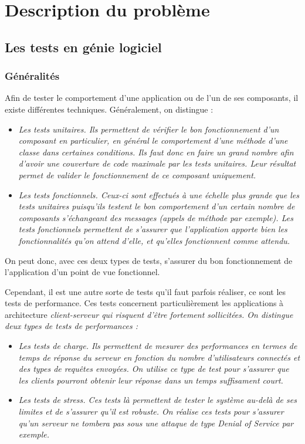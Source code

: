 \chapter{Description du problème}

\section{Les tests en génie logiciel}
\subsection{Généralités}
Afin de tester le comportement d'une application ou de l'un de ses composants, il existe différentes techniques. Généralement, on distingue :
\begin{itemize}
  \item \em{Les tests unitaires}. Ils permettent de vérifier le bon fonctionnement d'un composant en particulier, en général le comportement d'une méthode d'une classe dans certaines conditions. Ils faut donc en faire un grand nombre afin d'avoir une couverture de code maximale par les tests unitaires. Leur résultat permet de valider le fonctionnement de ce composant uniquement.
  \item \em{Les tests fonctionnels}. Ceux-ci sont effectués à une échelle plus grande que les tests unitaires puisqu'ils testent le bon comportement d'un certain nombre de composants s'échangeant des messages (appels de méthode par exemple). Les tests fonctionnels permettent de s'assurer que l'application apporte bien les fonctionnalités qu'on attend d'elle, et qu'elles fonctionnent comme attendu.
\end{itemize}

On peut donc, avec ces deux types de tests, s'assurer du bon fonctionnement de l'application d'un point de vue fonctionnel.

Cependant, il est une autre sorte de tests qu'il faut parfois réaliser, ce sont les tests de performance. Ces tests concernent particulièrement les applications à architecture \em{client-serveur} qui risquent d'être fortement sollicitées. On distingue deux types de tests de performances : 
\begin{itemize}
  \item \em{Les tests de charge}. Ils permettent de mesurer des performances en termes de temps de réponse du serveur en fonction du nombre d'utilisateurs connectés et des types de requêtes envoyées. On utilise ce type de test pour s'assurer que les clients pourront obtenir leur réponse dans un temps suffisament court.
  \item \em{Les tests de stress}. Ces tests là permettent de tester le système au-delà de ses limites et de s'assurer qu'il est robuste. On réalise ces tests pour s'assurer qu'un serveur ne tombera pas sous une attaque de type \em{Denial of Service} par exemple.
\end{itemize}


